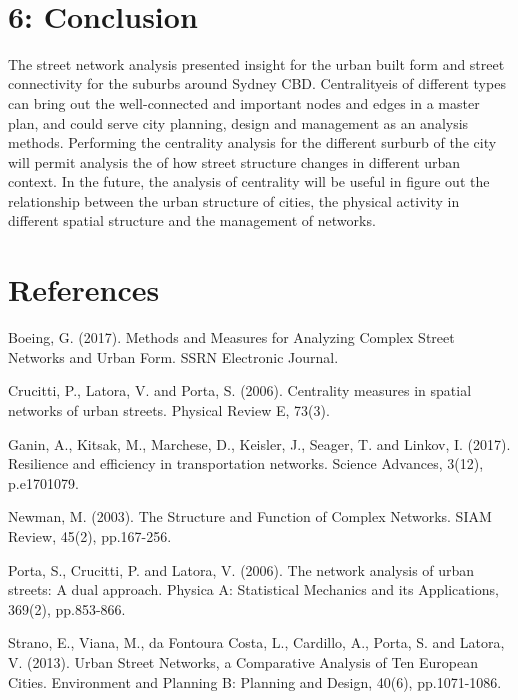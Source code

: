 \documentclass[11pt]{article}
\begin{document}
    \begin{center}
    \end{center}
    { \hspace*{\fill} \\}
    
    \section{6: Conclusion}\label{conclusion}

    The street network analysis presented insight for the urban built form
and street connectivity for the suburbs around Sydney CBD. Centralityeis
of different types can bring out the well-connected and important nodes
and edges in a master plan, and could serve city planning, design and
management as an analysis methods. Performing the centrality analysis
for the different surburb of the city will permit analysis the of how
street structure changes in different urban context. In the future, the
analysis of centrality will be useful in figure out the relationship
between the urban structure of cities, the physical activity in
different spatial structure and the management of networks.

    \section{References}\label{references}

Boeing, G. (2017). Methods and Measures for Analyzing Complex Street
Networks and Urban Form. SSRN Electronic Journal.

Crucitti, P., Latora, V. and Porta, S. (2006). Centrality measures in
spatial networks of urban streets. Physical Review E, 73(3).

Ganin, A., Kitsak, M., Marchese, D., Keisler, J., Seager, T. and Linkov,
I. (2017). Resilience and efficiency in transportation networks. Science
Advances, 3(12), p.e1701079.

Newman, M. (2003). The Structure and Function of Complex Networks. SIAM
Review, 45(2), pp.167-256.

Porta, S., Crucitti, P. and Latora, V. (2006). The network analysis of
urban streets: A dual approach. Physica A: Statistical Mechanics and its
Applications, 369(2), pp.853-866.

Strano, E., Viana, M., da Fontoura Costa, L., Cardillo, A., Porta, S.
and Latora, V. (2013). Urban Street Networks, a Comparative Analysis of
Ten European Cities. Environment and Planning B: Planning and Design,
40(6), pp.1071-1086.


    
    
    
    
\end{document}

